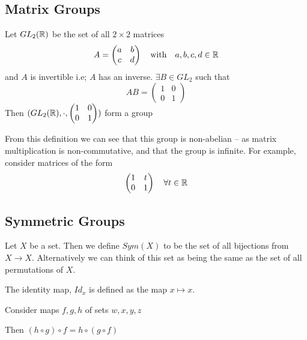 \documentclass{article}
\begin{document}

\subsection{Matrix Groups}
\begin{defi}
    Let $GL_2(\mathbb{R})$ be the set of all $2 \times 2$ matrices
    \[
        A = \begin{pmatrix}
            a & b \\
            c & d
        \end{pmatrix} \quad \text{with} \quad a,b,c,d \in \mathbb{R}
    \]
    and $A$ is invertible i.e; $A$ has an inverse. $\exists B \in GL_2$ such that
    \[
        AB = \begin{pmatrix}
            1 & 0 \\
            0 & 1
        \end{pmatrix}
    \]
    Then $(GL_2(\mathbb{R}), \cdot, \begin{pmatrix}
        1 & 0 \\
        0 & 1
    \end{pmatrix})$ form a group
\end{defi}

From this definition we can see that this group is non-abelian -- as matrix multiplication is non-commutative, and that the group is infinite. For example, consider matrices of the form
\[
    \begin{pmatrix}
        1 & t \\
        0 & 1
    \end{pmatrix} \quad \forall t \in \mathbb{R}
\]

\subsection{Symmetric Groups}
\begin{defi}[$Sym(X)$]
    Let $X$ be a set. Then we define $Sym(X)$ to be the set of all bijections from $X \rightarrow X$. Alternatively we can think of this set as being the same as the set of all permutations of $X$.
\end{defi}

\begin{defi}[$Id_x$]
    The identity map, $Id_x$ is defined as the map $x \mapsto x$. 
\end{defi}

\begin{lemma}
    Consider maps $f, g, h$ of sets $w, x, y, z$
    \begin{center}
    \end{center}
    Then $(h \circ g) \circ f = h \circ (g \circ f)$
\end{lemma}
\end{document}
